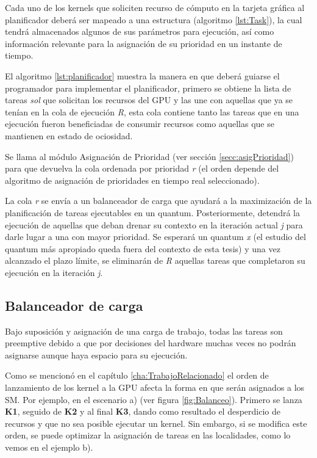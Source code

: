 Cada uno de los kernels que soliciten recurso de cómputo en la tarjeta gráfica al planificador deberá ser mapeado a una estructura (algoritmo \ref{lst:Task}), la cual tendrá almacenados algunos de sus parámetros para ejecución, así como información relevante para la asignación de su prioridad en un instante de tiempo.
\newline

El algoritmo \ref{lst:planificador} muestra la manera en que deberá guiarse el programador para implementar el planificador, primero se obtiene la lista de tareas \textit{sol} que solicitan los recursos del GPU y las une con aquellas que ya se tenían en la cola de ejecución \textit{R}, esta cola contiene tanto las tareas que en una ejecución fueron beneficiadas de consumir recursos como aquellas que se mantienen en estado de ociosidad.

Se llama al módulo Asignación de Prioridad (ver sección \ref{secc:asigPrioridad}) para que devuelva la cola ordenada por prioridad \textit{r} (el orden depende del algoritmo de asignación de prioridades en tiempo real seleccionado).

La cola \textit{r} se envía a un balanceador de carga que ayudará a la maximización de la planificación de tareas ejecutables en un quantum. Posteriormente, detendrá la ejecución de aquellas que deban drenar su contexto en la iteración actual \textit{j} para darle lugar a una con mayor prioridad.
Se esperará un quantum \textit{x} (el estudio del quantum más apropiado queda fuera del contexto de esta tesis) y una vez alcanzado el plazo límite, se eliminarán de \textit{R} aquellas tareas que completaron su ejecución en la iteración \textit{j}. 



\subsection{Balanceador de carga} \label{secc:balanceador}

Bajo suposición y asignación de una carga de trabajo, todas las tareas son preemptive debido a que por decisiones del hardware muchas veces no podrán asignarse aunque haya espacio para su ejecución.
\newline

Como se mencionó en el capítulo \ref{cha:TrabajoRelacionado} el orden de lanzamiento de los kernel a la GPU afecta la forma en que serán asignados a los SM. Por ejemplo, en el escenario a) (ver figura \ref{fig:Balanceo}). Primero se lanza \textbf{K1}, seguido de \textbf{K2} y al final \textbf{K3}, dando como resultado el desperdicio de recursos y que no sea posible ejecutar un kernel. Sin embargo, si se modifica este orden, se puede optimizar la asignación de tareas en las localidades, como lo vemos en el ejemplo b).
\newline

